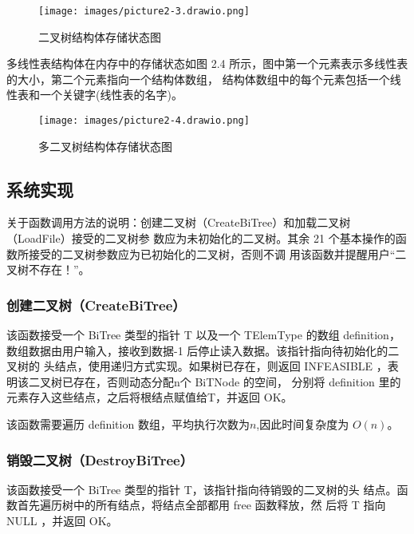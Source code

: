 \documentclass[supercite]{Experimental_Report}
\theoremstyle{definition}
\begin{document}
\begin{figure}[H]
	\begin{center}
		\texttt{[image: images/picture2-3.drawio.png]}
		\vspace{0.6cm}
		\caption{二叉树结构体存储状态图}
		\label{fig2-3}
	\end{center}
\end{figure}

多线性表结构体在内存中的存储状态如图 2.4 所示，图中第一个元素表示多线性表的大小，第二个元素指向一个结构体数组，
结构体数组中的每个元素包括一个线性表和一个关键字(线性表的名字)。

\begin{figure}[H]
	\begin{center}
		\texttt{[image: images/picture2-4.drawio.png]}
		\vspace{0.6cm}
		\caption{多二叉树结构体存储状态图}
		\label{fig2-4}
	\end{center}
\end{figure}

\subsection{系统实现}
关于函数调用方法的说明：创建二叉树（CreateBiTree）和加载二叉树（LoadFile）接受的二叉树参
数应为未初始化的二叉树。其余 21 个基本操作的函数所接受的二叉树参数应为已初始化的二叉树，否则不调
用该函数并提醒用户“二叉树不存在！”。
\subsubsection{创建二叉树（CreateBiTree）}
该函数接受一个 BiTree 类型的指针 T 以及一个 TElemType 的数组 definition，数组数据由用户输入，接收到数据-1
后停止读入数据。该指针指向待初始化的二叉树的
头结点，使用递归方式实现。如果树已存在，则返回 INFEASIBLE ，表明该二叉树已存在，否则动态分配n个 BiTNode 的空间，
分别将 definition 里的元素存入这些结点，之后将根结点赋值给T，并返回 OK。

该函数需要遍历 definition 数组，平均执行次数为$n$,因此时间复杂度为 $O(n)$。

\subsubsection{销毁二叉树（DestroyBiTree）}

该函数接受一个 BiTree 类型的指针 T，该指针指向待销毁的二叉树的头
结点。函数首先遍历树中的所有结点，将结点全部都用 free 函数释放，然
后将 T 指向 NULL ，并返回 OK。
\end{document}
